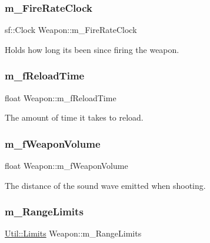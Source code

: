 \subsubsection{\texorpdfstring{m\+\_\+\+Fire\+Rate\+Clock}{m\_FireRateClock}}
{\footnotesize\ttfamily sf\+::\+Clock Weapon\+::m\+\_\+\+Fire\+Rate\+Clock\hspace{0.3cm}{\ttfamily [private]}}



Holds how long its been since firing the weapon. 

\mbox{\label{class_weapon_ade417935ef64756d69ee3daf0870b61b}} 
\subsubsection{\texorpdfstring{m\+\_\+f\+Reload\+Time}{m\_fReloadTime}}
{\footnotesize\ttfamily float Weapon\+::m\+\_\+f\+Reload\+Time\hspace{0.3cm}{\ttfamily [private]}}



The amount of time it takes to reload. 

\mbox{\label{class_weapon_a1b91345de3c92a8862221736b58834ab}} 
\subsubsection{\texorpdfstring{m\+\_\+f\+Weapon\+Volume}{m\_fWeaponVolume}}
{\footnotesize\ttfamily float Weapon\+::m\+\_\+f\+Weapon\+Volume\hspace{0.3cm}{\ttfamily [private]}}



The distance of the sound wave emitted when shooting. 

\mbox{\label{class_weapon_add73ac1e48373c7ffffa3bd3d48cf3f8}} 
\subsubsection{\texorpdfstring{m\+\_\+\+Range\+Limits}{m\_RangeLimits}}
{\footnotesize\ttfamily \hyperlink{struct_util_1_1_limits}{Util\+::\+Limits} Weapon\+::m\+\_\+\+Range\+Limits\hspace{0.3cm}{\ttfamily [private]}}




